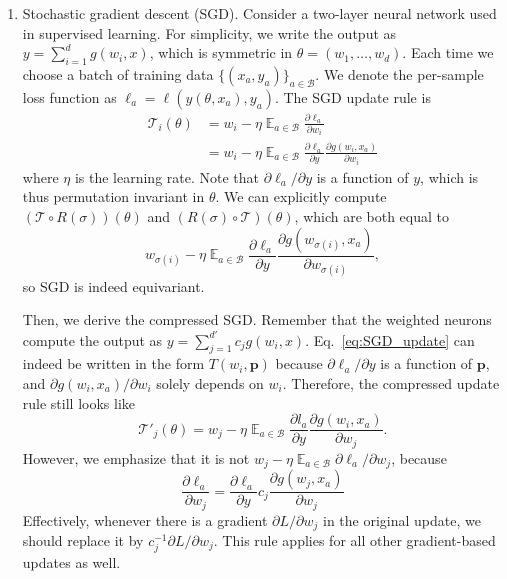 \documentclass{article}
\theoremstyle{plain}
\newcommand{\Exp}{\mathop{\mathbb{E}}}
\begin{document}
\begin{enumerate}
    \item Stochastic gradient descent (SGD). Consider a two-layer neural network used in supervised learning. For simplicity, we write the output as $y = \sum_{i=1}^d g(w_i, x)$, which is symmetric in $\theta=(w_1, \dots, w_d)$. Each time we choose a batch of training data $\{(x_a, y_a)\}_{a\in \mathcal{B}}$. We denote the per-sample loss function as $\ell_a = \ell (y(\theta, x_a), y_a)$. The SGD update rule is 
    \begin{equation}    \label{eq:SGD_update}
    \begin{aligned}
        \mathcal{T}_i(\theta) 
        &= w_i - \eta \Exp_{a\in\mathcal{B}}\frac{\partial \ell_a}{\partial w_i}   \\
        &= w_i - \eta \Exp_{a\in\mathcal{B}}\frac{\partial \ell_a}{\partial y} \frac{\partial g(w_i, x_a)}{\partial w_i} 
    \end{aligned}
    \end{equation}
    where $\eta$ is the learning rate. Note that $\partial\ell_a / \partial y$ is a function of $y$, which is thus permutation invariant in $\theta$. We can explicitly compute $(\mathcal{T}\circ R(\sigma))(\theta)$ and $(R(\sigma) \circ \mathcal{T})(\theta)$, which are both equal to
    \begin{equation}
        w_{\sigma(i)} - \eta \Exp_{a\in\mathcal{B}}\frac{\partial \ell_a}{\partial y} \frac{\partial g(w_{\sigma(i)}, x_a)}{\partial w_{\sigma(i)}}    ,
    \end{equation}
    so SGD is indeed equivariant. 
    
    Then, we derive the compressed SGD. Remember that the weighted neurons compute the output as $y = \sum_{j=1}^{d'} c_j g(w_i, x)$. Eq.~\eqref{eq:SGD_update} can indeed be written in the form $T(w_i, \bm{p})$ because $\partial\ell_a / \partial y$ is a function of $\bm{p}$, and $\partial g(w_i, x_a)/\partial w_i$ solely depends on $w_i$. Therefore, the compressed update rule still looks like
    \begin{equation}
        \mathcal{T}'_j(\theta) = w_j - \eta \Exp_{a\in\mathcal{B}}\frac{\partial l_a}{\partial y} \frac{\partial g(w_i, x_a)}{\partial w_j} .
    \end{equation}
    However, we emphasize that it is not $w_j - \eta \Exp_{a\in\mathcal{B}} \partial \ell_a/\partial w_j$, because
    \begin{equation}
        \frac{\partial \ell_a}{\partial w_j} = \frac{\partial \ell_a}{\partial y} c_j \frac{\partial g(w_j, x_a)}{\partial w_j}
    \end{equation}
    Effectively, whenever there is a gradient $\partial L/\partial w_j$ in the original update, we should replace it by $c_j^{-1} \partial L/\partial w_j$. 
    This rule applies for all other gradient-based updates as well. 


\end{enumerate}
\end{document}
